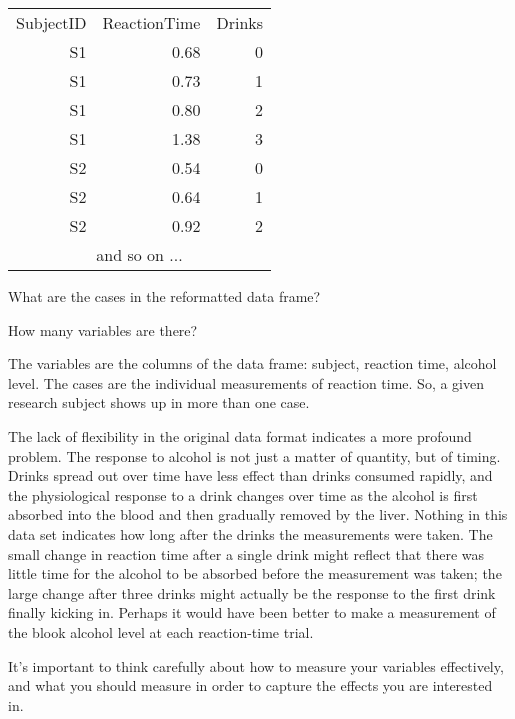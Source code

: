 \bigskip
\begin{tabular}{rrr}
SubjectID & ReactionTime & Drinks\\
S1 & 0.68 & 0 \\
S1 & 0.73 & 1 \\
S1 & 0.80 & 2 \\
S1 & 1.38 & 3 \\
S2 & 0.54 & 0 \\
S2 & 0.64 & 1 \\
S2 & 0.92 & 2 \\
\multicolumn{3}{c}{and so on ...}\\
\end{tabular}
\bigskip

\noindent What are the cases in the reformatted data frame?\\
\begin{MultipleChoice}
\end{MultipleChoice}

\bigskip 

\noindent How many variables are there?\\
\begin{MultipleChoice}
\end{MultipleChoice}

\begin{AnswerText}
The variables are the columns of the data frame: subject, reaction
time, alcohol level.  The cases are the individual measurements of
reaction time.  So, a given research subject shows up in more than one
case. 
\end{AnswerText}

The lack of flexibility in the original data format indicates a more
profound problem.  The response to alcohol is not just a matter of
quantity, but of timing.  Drinks spread out over time have less effect
than drinks consumed rapidly, and the physiological response to a
drink changes over time as the alcohol is first absorbed into the
blood and then gradually removed by the liver.  Nothing in this data
set indicates how long after the drinks the measurements were taken.
The small change in reaction time after a single drink might reflect that
there was little time for the alcohol to be absorbed before the
measurement was taken; the large change after three drinks might
actually be the response to the first drink finally kicking in.
Perhaps it would have been better to make a measurement of the blook
alcohol level at each reaction-time trial.

It's important to think carefully about how to measure your variables
effectively, and what you should measure in order to capture the
effects you are interested in.

